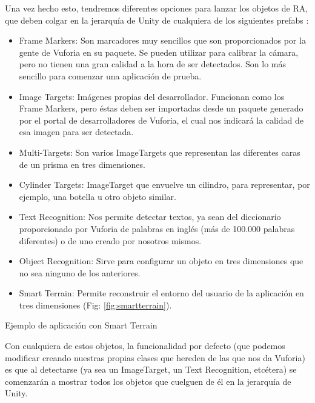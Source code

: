 Una vez hecho esto, tendremos diferentes opciones para lanzar los objetos de RA, que deben colgar en la jerarquía de Unity de cualquiera de los siguientes prefabs \cite{vuforia}:

\begin{itemize}
\item{Frame Markers: Son marcadores muy sencillos que son proporcionados por la gente de Vuforia en su paquete. Se pueden utilizar para calibrar la cámara, pero no tienen una gran calidad a la hora de ser detectados. Son lo más sencillo para comenzar una aplicación de prueba.}

\item{Image Targets: Imágenes propias del desarrollador. Funcionan como los Frame Markers, pero éstas deben ser importadas desde un paquete generado por el portal de desarrolladores de Vuforia, el cual nos indicará la calidad de esa imagen para ser detectada.}

\item{Multi-Targets: Son varios ImageTargets que representan las diferentes caras de un prisma en tres dimensiones.}

\item{Cylinder Targets: ImageTarget que envuelve un cilindro, para representar, por ejemplo, una botella u otro objeto similar.}

\item{Text Recognition: Nos permite detectar textos, ya sean del diccionario proporcionado por Vuforia de palabras en inglés (más de 100.000 palabras diferentes) o de uno creado por nosotros mismos.}

\item{Object Recognition: Sirve para configurar un objeto en tres dimensiones que no sea ninguno de los anteriores.}

\item{Smart Terrain: Permite reconstruir el entorno del usuario de la aplicación en tres dimensiones (Fig: \ref{fig:smartterrain}).}
\end{itemize}

		{Ejemplo de aplicación con Smart Terrain}

Con cualquiera de estos objetos, la funcionalidad por defecto (que podemos modificar creando nuestras propias clases que hereden de las que nos da Vuforia) es que al detectarse (ya sea un ImageTarget, un Text Recognition, etcétera) se comenzarán a mostrar todos los objetos que cuelguen de él en la jerarquía de Unity.

